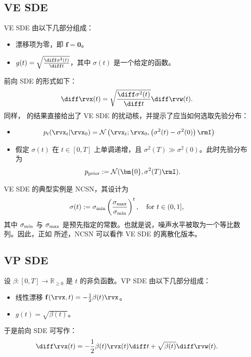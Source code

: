 \subsection{VE SDE}
VE SDE 由以下几部分组成：
\begin{itemize}
    \item {} 漂移项为零，即 $\mathbf{f}=\bm{0}$。
    \item {} $g(t)=\sqrt{\frac{\diff \sigma^2(t)}{\diff t}}$，其中 $\sigma(t)$ 是一个给定的函数。
\end{itemize}
前向 SDE 的形式如下：
\begin{equation}\label{eq:vesde}
    \diff\rvx(t) =  \sqrt{\frac{\diff \sigma^2(t)}{\diff t}} \diff\rvw(t).
\end{equation}
同样， 的结果直接给出了 VE SDE 的扰动核，并提示了应当如何选取先验分布：
\begin{itemize}
    \item {}
\begin{align*}
        p_t(\rvx_t | \rvx_0) &= \mathcal{N}\left(\rvx_t ; \rvx_0, \left(\sigma^2(t) - \sigma^2(0)\right)\rmI\right)
\end{align*}
    \item {} 假定 $\sigma(t)$ 在 $t \in [0,T]$ 上单调递增，且 $\sigma^2(T) \gg \sigma^2(0)$。此时先验分布为
    \[
    p_{\mathrm{prior}} := \mathcal{N}(\bm{0}, \sigma^2(T)\rmI).
    \]
\end{itemize}

VE SDE 的典型实例是 NCSN，其设计为
\[
\sigma(t):=\sigma_{\textup{min}}\left(\frac{\sigma_{\textup{max}}}{\sigma_{\textup{min}}} \right)^t,\quad \text{for } t\in(0,1],
\]
其中 $\sigma_{\textup{min}}$ 与 $\sigma_{\textup{max}}$ 是预先指定的常数。也就是说，噪声水平被取为一个等比数列。因此，正如  所述，NCSN 可以看作 VE SDE 的离散化版本。


\subsection{VP SDE}
设 $\beta\colon [0,T] \rightarrow \mathbb{R}_{\geq 0 }$ 是 $t$ 的非负函数。VP SDE 由以下几部分组成：
\begin{itemize}
    \item {} 线性漂移 $\mathbf{f}(\rvx, t) = -\frac{1}{2}\beta(t)\rvx$。
    \item {} $g(t) = \sqrt{\beta(t)}$。
\end{itemize}
于是前向 SDE 可写作：
\begin{align}\label{eq:forward-linear-sde}
\diff\rvx(t) = -\frac{1}{2}\beta(t) \rvx(t) \diff t + \sqrt{\beta(t)} \diff\rvw(t).
\end{align}

